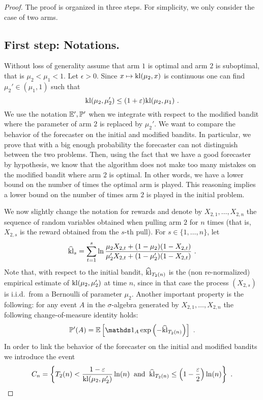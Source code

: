 \begin{proof}
The proof is organized in three steps. For simplicity, we only consider the case of two arms.

\subsection*{First step: Notations.}
Without loss of generality assume that arm $1$ is optimal and arm $2$ is suboptimal, that is $\mu_2 < \mu_1 < 1$. Let $\epsilon > 0$. Since $x \mapsto \mathrm{kl}(\mu_2,x)$ is continuous one can find $\mu_2' \in (\mu_1,1)$ such that
\begin{equation} \label{eq:defmu2prime}
\mathrm{kl}(\mu_2,\mu_2') \leq (1+\varepsilon) \mathrm{kl}(\mu_2,\mu_1)~.
\end{equation}
We use the notation $\mathbb{E}', \mathbb{P}'$ when we integrate with respect to the modified bandit where the parameter of arm $2$ is replaced by $\mu_2'$. We want to compare the behavior of the forecaster on the initial and modified bandits. In particular, we prove that with a big enough probability the forecaster can not distinguish between the two problems. Then, using the fact that we have a good forecaster by hypothesis, we know that the algorithm does not make too many mistakes on the modified bandit where arm $2$ is optimal. In other words, we have a lower bound on the number of times the optimal arm is played. This reasoning implies a lower bound on the number of times arm $2$ is played in the initial problem.

We now slightly change the notation for rewards and denote by $X_{2,1}, \hdots, X_{2,n}$ the sequence of random variables obtained when pulling arm $2$ for $n$ times (that is, $X_{2,s}$ is the reward obtained from the $s$-th pull).
For $s \in \{1, \hdots, n\}$, let
$$\widehat{\mathrm{kl}}_s=\sum_{t=1}^{s} \ln \frac{\mu_2 X_{2,t} + (1-\mu_2) (1-X_{2,t})}{\mu_2' X_{2,t} + (1-\mu_2') (1-X_{2,t})}~.$$
Note that, with respect to the initial bandit, $\widehat{\mathrm{kl}}_{T_2(n)}$ is the (non re-normalized) empirical estimate of $\mathrm{kl}(\mu_2, \mu_2')$ at time $n$, since in that case the process $(X_{2,s})$ is i.i.d.\ from a Bernoulli of parameter $\mu_2$. Another important property is the following: for any event $A$ in the $\sigma$-algebra generated by $X_{2,1},\dots,X_{2,n}$ the following change-of-measure identity holds:
\begin{equation} \label{eq:KLchapeauprop}
\P'(A) = \E \left[\ds1_{A} \exp\left(- \widehat{\kl}_{T_2(n)} \right)\right]~.
\end{equation}
%
In order to link the behavior of the forecaster on the initial and modified bandits we introduce the event
\begin{equation} \label{eq:cndef}
C_n = \left\{ T_2(n) < \frac{1-\varepsilon}{\mathrm{kl}(\mu_2,\mu_2')} \ln(n) \;\; \text{and} \;\; \widehat{\mathrm{kl}}_{T_2(n)} \leq \left(1-\frac{\varepsilon}{2}\right) \ln(n) \right\}~.
\end{equation}


\end{proof}
